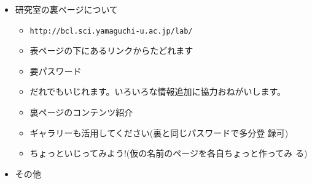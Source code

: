 \documentclass[twocolumn,11pt]{jsarticle}
\begin{document}
\begin{itemize}
\item 研究室の裏ページについて
  \begin{itemize}
  \item \verb|http://bcl.sci.yamaguchi-u.ac.jp/lab/|
  \item 表ページの下にあるリンクからたどれます
  \item 要パスワード
  \item だれでもいじれます。いろいろな情報追加に協力おねがいします。
  \item 裏ページのコンテンツ紹介
  \item ギャラリーも活用してください(裏と同じパスワードで多分登
    録可)
  \item ちょっといじってみよう!(仮の名前のページを各自ちょっと作ってみ
  る)
  \end{itemize}
\item その他
\end{itemize}
\end{document}
